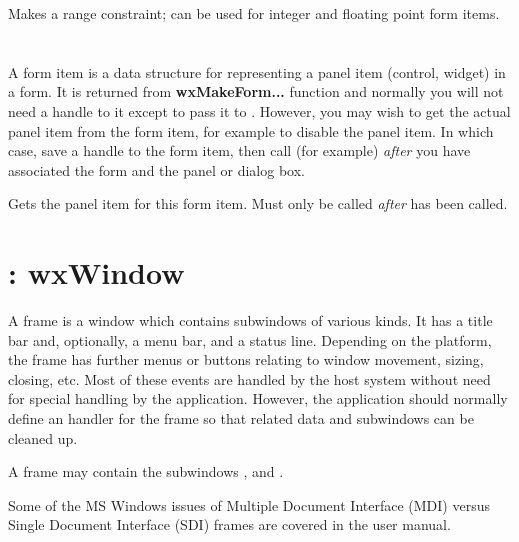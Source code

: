 
Makes a range constraint; can be used for integer and floating point
form items.

\section{}\label{wxformitem}

A form item is a data structure for representing a panel item (control, widget) in a form.
It is returned from {\bf wxMakeForm...} function and normally you will not need a handle
to it except to pass it to . However, you may wish
to get the actual panel item from the form item, for example to disable the panel item.
In which case, save a handle to the form item, then call (for
example)  {\it after} you
have associated the form and the panel or dialog box.

\label{wxformitemgetitem}


Gets the panel item for this form item. Must only be called {\it after}\rtfsp
{} has been called.

\section{: wxWindow}\label{wxframe}

A frame is a window which contains subwindows of various kinds. It has a
title bar and, optionally, a menu bar, and a status line.  Depending on
the platform, the frame has further menus or buttons relating to window
movement, sizing, closing, etc. Most of these events are handled by the host
system without need for special handling by the application. However,
the application should normally define an  handler for the
frame so that related data and subwindows can be cleaned up.

A frame may contain the subwindows , \rtfsp
and .

Some of the MS Windows issues of Multiple Document Interface (MDI) versus
Single Document Interface (SDI) frames are covered in the user manual.

